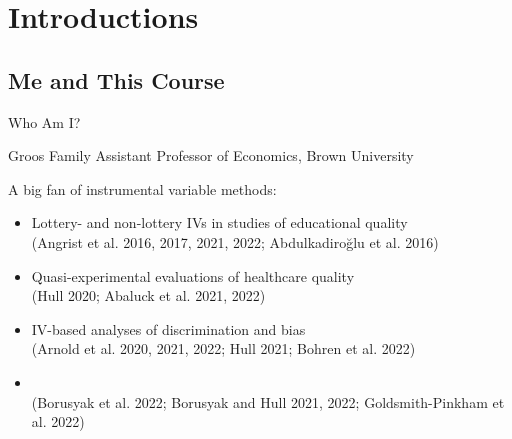 \documentclass[t]{beamer}
\begin{document}
\setlength{\abovedisplayskip}{5pt}
\setlength{\belowdisplayskip}{5pt}
\setlength{\abovedisplayshortskip}{5pt}
\setlength{\belowdisplayshortskip}{5pt}


\section{Introductions}

\subsection{Me and This Course}
\begin{frame}{Who Am I?}

Groos Family Assistant Professor of Economics, Brown University\pause

A big fan of instrumental variable methods:\pause
\begin{itemize}
  \item Lottery- and non-lottery IVs in studies of educational quality \\ {\scriptsize \textcolor{red!75!green!50!blue!25!gray}{(Angrist et al. 2016, 2017, 2021, 2022; Abdulkadiro\u{g}lu et al. 2016)}}
  \item Quasi-experimental evaluations of healthcare quality \\ {\scriptsize \textcolor{red!75!green!50!blue!25!gray}{(Hull 2020; Abaluck et al. 2021, 2022)}}
  \item IV-based analyses of discrimination and bias \\ {\scriptsize \textcolor{red!75!green!50!blue!25!gray}{(Arnold et al. 2020, 2021, 2022; Hull 2021; Bohren et al. 2022)}}

  \item {} \\ {\scriptsize \textcolor{red!75!green!50!blue!25!gray}{(Borusyak et al. 2022; Borusyak and Hull 2021, 2022; Goldsmith-Pinkham et al. 2022)}}
\end{itemize}

\end{frame}
\end{document}
